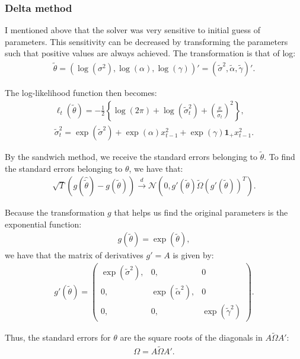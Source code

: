 \documentclass[11pt,a4paper,oneside]{article}
\newcommand{\lp}{\left(}
\newcommand{\rp}{\right)}
\newcommand{\lc}{\left\{}
\newcommand{\rc}{\right\}}
\newcommand{\nnn}{\mathcal{N}}
\newcommand{\ii}{\mathbf{1}}
\begin{document}
\subsubsection{Delta method}
I mentioned above that the solver was very sensitive to initial guess of parameters. This sensitivity can be decreased by transforming the parameters such that positive values are always achieved. The transformation is that of log:
\begin{align}
    \tilde \theta = \lp \log\lp \sigma^2\rp, \log \lp \alpha\rp, \log\lp \gamma\rp\rp' = \lp \tilde \sigma^2, \tilde \alpha, \tilde \gamma\rp'.
\end{align}

The log-likelihood function then becomes:
\begin{gather*}
    \ell_t\lp \tilde\theta\rp = -\frac{1}{2}\lc \log\lp 2\pi\rp + \log\lp \tilde \sigma_t^2\rp + \lp \frac{x}{\tilde \sigma_t}\rp^2\rc,\\
    \tilde \sigma_t^2 = \exp\lp \tilde \sigma^2\rp + \exp\lp \alpha\rp x_{t-1}^2 + \exp\lp \gamma\rp \ii_+ x_{t-1}^2.
\end{gather*}

By the sandwich method, we receive the standard errors belonging to $\tilde \theta$. To find the standard errors belonging to $\theta$, we have that:
\begin{align}
    \sqrt{T}\lp g\lp \hat{\tilde\theta}\rp - g\lp \tilde \theta\rp\rp \overset{d}{\rightarrow}\nnn\lp 0, g'\lp \tilde \theta\rp \tilde \Omega \lp g'\lp \tilde \theta\rp \rp^T\rp.
\end{align}

Because the transformation $g$ that helps us find the original parameters is the exponential function:
\begin{align*}
    g\lp \tilde \theta\rp = \exp\lp \tilde \theta\rp,
\end{align*}
we have that the matrix of derivatives $g' = A$ is given by:
\begin{align}
    g'\lp \tilde \theta\rp =
        \begin{pmatrix}
            \exp\lp \tilde \sigma^2\rp, & 0, & 0\\
            0, & \exp\lp \tilde \alpha^2\rp, & 0\\
            0, & 0, & \exp\lp \tilde \gamma^2\rp
        \end{pmatrix}.
\end{align}

Thus, the standard errors for $\theta$ are the square roots of the diagonals in $A \tilde \Omega A'$:
\begin{align}
    \Omega = A \tilde \Omega A'.
\end{align}
\end{document}
